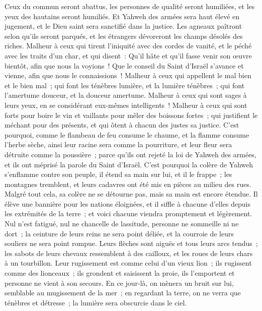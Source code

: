 \begin{multicols}{2}
Ceux du commun seront abattus, les personnes de qualité seront humiliées, et les yeux des hautains seront humiliés.
Et Yahweh des armées sera haut élevé en jugement, et le Dieu saint sera sanctifié dans la justice.
Les agneaux paîtront selon qu'ils seront parqués, et les étrangers dévoreront les champs désolés des riches.
Malheur à ceux qui tirent l'iniquité avec des cordes de vanité, et le péché avec les traits d'un char,
et qui disent~: Qu'il hâte et qu'il fasse venir son œuvre bientôt, afin que nous la voyions~! Que le conseil du Saint d'Israël s'avance et vienne, afin que nous le connaissions~!
Malheur à ceux qui appellent le mal bien et le bien mal~; qui font les ténèbres lumière, et la lumière ténèbres~; qui font l'amertume douceur, et la douceur amertume.
Malheur à ceux qui sont sages à leurs yeux, en se considérant eux-mêmes intelligents~!
Malheur à ceux qui sont forts pour boire le vin et vaillants pour mêler des boissons fortes~;
qui justifient le méchant pour des présents, et qui ôtent à chacun des justes sa justice.
C'est pourquoi, comme le flambeau de feu consume le chaume, et la flamme consume l'herbe sèche, ainsi leur racine sera comme la pourriture, et leur fleur sera détruite comme la poussière~; parce qu'ils ont rejeté la loi de Yahweh des armées, et ils ont méprisé la parole du Saint d'Israël.
C'est pourquoi la colère de Yahweh s'enflamme contre son peuple, il étend sa main sur lui, et il le frappe~; les montagnes tremblent, et leurs cadavres ont été mis en pièces au milieu des rues. Malgré tout cela, sa colère ne se détourne pas, mais sa main est encore étendue.
Il élève une bannière pour les nations éloignées, et il siffle à chacune d'elles depuis les extrémités de la terre~; et voici chacune viendra promptement et légèrement.
Nul n'est fatigué, nul ne chancelle de lassitude, personne ne sommeille ni ne dort~; la ceinture de leurs reins ne sera point déliée, et la courroie de leurs souliers ne sera point rompue.
Leurs flèches sont aiguës et tous leurs arcs tendus~; les sabots de leurs chevaux ressemblent à des cailloux, et les roues de leurs chars à un tourbillon.
Leur rugissement est comme celui d'un vieux lion~; ils rugissent comme des lionceaux~; ils grondent et saisissent la proie, ils l'emportent et personne ne vient à son secours.
En ce jour-là, on mènera un bruit sur lui, semblable au mugissement de la mer~; en regardant la terre, on ne verra que ténèbres et détresse~; la lumière sera obscurcie dans le ciel.

\end{multicols}
